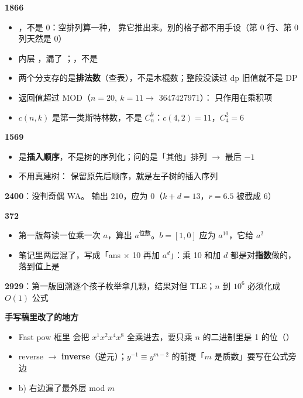 \begin{mynote}
\textbf{1866}
\begin{itemize}
\item {}，不是 0：空排列算一种， 靠它推出来。别的格子都不用手设（第 0 行、第 0 列天然是 0）
\item 内层 ，漏了 ；，不是 \code{[n+1][k+1]}
\item 两个分支存的是\textbf{排法数}（查表），不是木棍数；整段没读过 dp 旧值就不是 DP
\item {} 返回值超过 MOD（$n=20,\ k=11 \to$ 3647427971）：\code{\%} 只作用在乘积项
\item $c(n,k)$ 是第一类斯特林数，不是 $C_n^k$：$c(4,2) = 11$，$C_4^2 = 6$
\end{itemize}
\textbf{1569}
\begin{itemize}
\item {} 是\textbf{插入顺序}，不是树的序列化；问的是「其他」排列 $\to$ 最后 $-1$
\item 不用真建树： 保留原先后顺序，就是左子树的插入序列
\end{itemize}
\textbf{2400}：没判奇偶 WA。 输出 210，应为 0（$k+d = 13$，$r = 6.5$ 被截成 6）\par
\textbf{372}
\begin{itemize}
\item 第一版每读一位乘一次 $a$，算出 $a^{\text{位数}}$。$b = [1, 0]$ 应为 $a^{10}$，它给 $a^2$
\item 笔记里两层混了，写成「ans $\times$ 10 再加 $a^d$」：乘 10 和加 $d$ 都是对\textbf{指数}做的，落到值上是 
\end{itemize}
\textbf{2929}：第一版回溯逐个孩子枚举拿几颗，结果对但 TLE；$n$ 到 $10^6$ 必须化成 $O(1)$ 公式\par
\textbf{手写稿里改了的地方}
\begin{itemize}
\item Fast pow 框里  会把 $x^1 x^2 x^4 x^8$ 全乘进去，要只乘 $n$ 的二进制里是 1 的位（）
\item reverse $\to$ \textbf{inverse}（逆元）；$y^{-1} \equiv y^{m-2}$ 的前提「$m$ 是质数」要写在公式旁边
\item b) 右边漏了最外层 mod $m$
\end{itemize}
\end{mynote}
